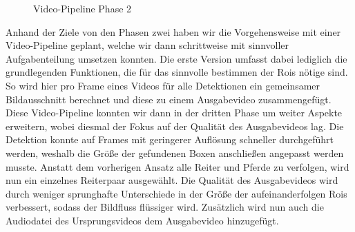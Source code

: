 \begin{figure}[h]
\centering
{}
\vspace*{-1cm}
\caption{Video-Pipeline Phase 2}
\end{figure}
Anhand der Ziele von den Phasen zwei haben wir die Vorgehensweise mit einer Video-Pipeline geplant, welche wir dann schrittweise mit sinnvoller Aufgabenteilung umsetzen konnten. Die erste Version umfasst dabei lediglich die grundlegenden Funktionen, die für das sinnvolle bestimmen der Rois nötige sind. So wird hier pro Frame eines Videos für alle Detektionen ein gemeinsamer Bildausschnitt berechnet und diese zu einem Ausgabevideo zusammengefügt.
Diese Video-Pipeline konnten wir dann in der dritten Phase um weiter Aspekte erweitern, wobei diesmal der Fokus auf der Qualität des Ausgabevideos lag. Die Detektion konnte auf Frames mit geringerer Auflösung schneller durchgeführt werden, weshalb die Größe der gefundenen Boxen anschließen angepasst werden musste. Anstatt dem vorherigen Ansatz alle Reiter und Pferde zu verfolgen, wird nun ein einzelnes Reiterpaar ausgewählt. Die Qualität des Ausgabevideos wird durch weniger sprunghafte Unterschiede in der Größe der aufeinanderfolgen Rois verbessert, sodass der Bildfluss flüssiger wird. Zusätzlich wird nun auch die Audiodatei des Ursprungsvideos dem Ausgabevideo hinzugefügt.


